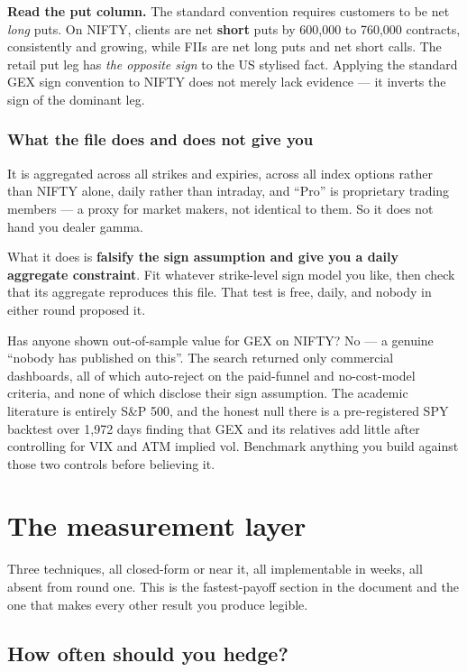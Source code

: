 \documentclass[11pt,a4paper]{article}
\newcommand{\srcnote}[1]{{\footnotesize\color{soft}#1\par}}
\begin{document}
\textbf{Read the put column.} The standard convention requires customers to be
net \emph{long} puts. On NIFTY, clients are net \textbf{short} puts by 600{,}000
to 760{,}000 contracts, consistently and growing, while FIIs are net long puts and
net short calls. The retail put leg has \emph{the opposite sign} to the US
stylised fact. Applying the standard GEX sign convention to NIFTY does not merely
lack evidence --- it inverts the sign of the dominant leg.

\subsubsection{What the file does and does not give you}

It is aggregated across all strikes and expiries, across all index options rather
than NIFTY alone, daily rather than intraday, and ``Pro'' is proprietary trading
members --- a proxy for market makers, not identical to them. So it does not hand
you dealer gamma.

What it does is \textbf{falsify the sign assumption and give you a daily aggregate
constraint}. Fit whatever strike-level sign model you like, then check that its
aggregate reproduces this file. That test is free, daily, and nobody in either
round proposed it.

\srcnote{Has anyone shown out-of-sample value for GEX on NIFTY? No --- a genuine
``nobody has published on this''. The search returned only commercial dashboards,
all of which auto-reject on the paid-funnel and no-cost-model criteria, and none
of which disclose their sign assumption. The academic literature is entirely S\&P
500, and the honest null there is a pre-registered SPY backtest over 1{,}972 days
finding that GEX and its relatives add little after controlling for VIX and ATM
implied vol. Benchmark anything you build against those two controls before
believing it.}

\newpage
\section{The measurement layer}
\label{sec:measure}

Three techniques, all closed-form or near it, all implementable in weeks, all
absent from round one. This is the fastest-payoff section in the document and the
one that makes every other result you produce legible.

\subsection{How often should you hedge?}
\end{document}
